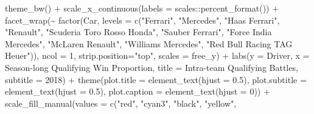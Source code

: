 \documentclass[
]{book}
\newenvironment{Shaded}{\begin{snugshade}}{\end{snugshade}}
\newcommand{\AttributeTok}[1]{\textcolor[rgb]{0.77,0.63,0.00}{#1}}
\newcommand{\DecValTok}[1]{\textcolor[rgb]{0.00,0.00,0.81}{#1}}
\newcommand{\FloatTok}[1]{\textcolor[rgb]{0.00,0.00,0.81}{#1}}
\newcommand{\FunctionTok}[1]{\textcolor[rgb]{0.00,0.00,0.00}{#1}}
\newcommand{\NormalTok}[1]{#1}
\newcommand{\SpecialCharTok}[1]{\textcolor[rgb]{0.00,0.00,0.00}{#1}}
\newcommand{\StringTok}[1]{\textcolor[rgb]{0.31,0.60,0.02}{#1}}
\begin{document}
\begin{Shaded}
\begin{Highlighting}[]
  \FunctionTok{theme\_bw}\NormalTok{() }\SpecialCharTok{+}
  \FunctionTok{scale\_x\_continuous}\NormalTok{(}\AttributeTok{labels =}\NormalTok{ scales}\SpecialCharTok{::}\FunctionTok{percent\_format}\NormalTok{()) }\SpecialCharTok{+}
  \FunctionTok{facet\_wrap}\NormalTok{(}\SpecialCharTok{\textasciitilde{}} \FunctionTok{factor}\NormalTok{(Car,}
                      \AttributeTok{levels =} \FunctionTok{c}\NormalTok{(}\StringTok{"Ferrari"}\NormalTok{,}
                                 \StringTok{"Mercedes"}\NormalTok{,}
                                 \StringTok{"Haas Ferrari"}\NormalTok{,}
                                 \StringTok{"Renault"}\NormalTok{,}
                                 \StringTok{"Scuderia Toro Rosso Honda"}\NormalTok{,}
                                 \StringTok{"Sauber Ferrari"}\NormalTok{, }
                                 \StringTok{"Force India Mercedes"}\NormalTok{,}
                                 \StringTok{"McLaren Renault"}\NormalTok{,}
                                 \StringTok{"Williams Mercedes"}\NormalTok{,}
                                 \StringTok{"Red Bull Racing TAG Heuer"}\NormalTok{)), }\AttributeTok{ncol =} \DecValTok{1}\NormalTok{, }\AttributeTok{strip.position=}\StringTok{"top"}\NormalTok{, }\AttributeTok{scales =} \StringTok{\textquotesingle{}free\_y\textquotesingle{}}\NormalTok{) }\SpecialCharTok{+}
  \FunctionTok{labs}\NormalTok{(}\AttributeTok{y =} \StringTok{\textquotesingle{}Driver\textquotesingle{}}\NormalTok{,}
       \AttributeTok{x =} \StringTok{\textquotesingle{}Season{-}long Qualifying Win Proportion\textquotesingle{}}\NormalTok{,}
       \AttributeTok{title =} \StringTok{\textquotesingle{}Intra{-}team Qualifying Battles\textquotesingle{}}\NormalTok{,}
       \AttributeTok{subtitle =} \StringTok{\textquotesingle{}2018\textquotesingle{}}\NormalTok{) }\SpecialCharTok{+}
  \FunctionTok{theme}\NormalTok{(}\AttributeTok{plot.title =} \FunctionTok{element\_text}\NormalTok{(}\AttributeTok{hjust =} \FloatTok{0.5}\NormalTok{),}
        \AttributeTok{plot.subtitle =} \FunctionTok{element\_text}\NormalTok{(}\AttributeTok{hjust =} \FloatTok{0.5}\NormalTok{),}
        \AttributeTok{plot.caption =} \FunctionTok{element\_text}\NormalTok{(}\AttributeTok{hjust =} \DecValTok{0}\NormalTok{)) }\SpecialCharTok{+}
  \FunctionTok{scale\_fill\_manual}\NormalTok{(}\AttributeTok{values =} \FunctionTok{c}\NormalTok{(}\StringTok{"red"}\NormalTok{, }
                                \StringTok{"cyan3"}\NormalTok{,  }
                                \StringTok{"black"}\NormalTok{, }
                                \StringTok{"yellow"}\NormalTok{,}

\end{Highlighting}
\end{Shaded}
\end{document}
